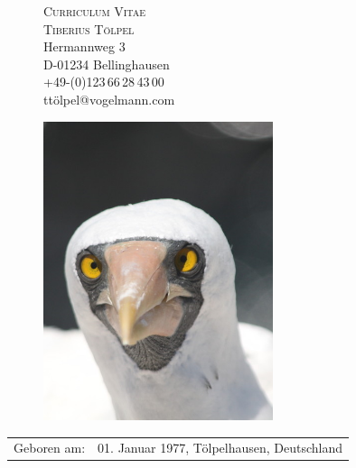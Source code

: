 \documentclass[11pt,a4paper,DIV=12]{scrartcl}
\begin{document}

\parindent0mm
\renewcommand{\arraystretch}{1.2}

\newenvironment{literatur}{%
  \parskip6pt \parindent0pt \raggedright
  \def\lititem{\hangindent=0.3cm \hangafter1}}{%
  \par\ignorespaces} 

\begin{figure}
\begin{minipage}{0.6\linewidth}
{\Huge \textsc{\textcolor{BlauTierraNueva}{Curriculum Vitae}}}\\[0.7cm]
{\Large \textsc{Tiberius Tölpel}}\\[0.2cm]
Hermannweg 3\\
D-01234 Bellinghausen\\
+49-(0)123\,66\,28\,43\,00\\
ttölpel@vogelmann.com\\[-1.5cm]
\end{minipage}
\begin{minipage}{0.4\linewidth}
\hspace*{2.2cm} \includegraphics[width=0.6\textwidth]{Passbild.jpg}
\end{minipage}
\end{figure}

\vspace*{0.3cm}

\begin{tabularx}{\textwidth}{p{2.8cm}X}
Geboren am: & 01. Januar 1977, Tölpelhausen, Deutschland\\
\end{tabularx}
\end{document}
